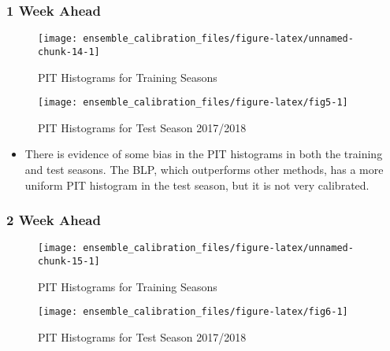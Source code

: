 \documentclass[
]{article}
\begin{document}
\hypertarget{week-ahead-4}{%
\subsubsection{1 Week Ahead}\label{week-ahead-4}}

\begin{figure}[H]

{\centering \texttt{[image: ensemble\_calibration\_files/figure-latex/unnamed-chunk-14-1]} 

}

\caption{PIT Histograms for Training Seasons}\label{fig:unnamed-chunk-14}
\end{figure}

\newpage

\begin{figure}[H]

{\centering \texttt{[image: ensemble\_calibration\_files/figure-latex/fig5-1]} 

}

\caption{PIT Histograms for Test Season 2017/2018}\label{fig:fig5}
\end{figure}

\begin{itemize}
\item There is evidence of some bias in the PIT histograms in both the training and test seasons. The BLP, which outperforms other methods, has a more uniform PIT histogram in the test season, but it is not very calibrated.
\end{itemize}

\newpage

\hypertarget{week-ahead-5}{%
\subsubsection{2 Week Ahead}\label{week-ahead-5}}

\begin{figure}[H]

{\centering \texttt{[image: ensemble\_calibration\_files/figure-latex/unnamed-chunk-15-1]} 

}

\caption{PIT Histograms for Training Seasons}\label{fig:unnamed-chunk-15}
\end{figure}

\newpage

\begin{figure}[H]

{\centering \texttt{[image: ensemble\_calibration\_files/figure-latex/fig6-1]} 

}

\caption{PIT Histograms for Test Season 2017/2018}\label{fig:fig6}
\end{figure}
\end{document}
